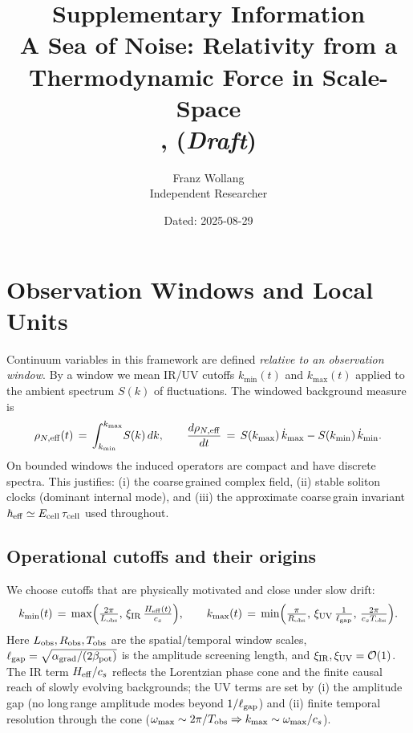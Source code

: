 \documentclass[11pt]{article}
\title{Supplementary Information\\A Sea of Noise: Relativity from a Thermodynamic Force in Scale-Space \\, (\textit{Draft})}
\author{Franz Wollang\\ \small Independent Researcher}
\date{\small Dated: 2025-08-29}
\begin{document}
\maketitle

\begin{center}
\setlength{\fboxsep}{8pt}%
\end{center}
\vspace{1em}

\tableofcontents
\vspace{1em}

\section{Observation Windows and Local Units}\label{si:window}
Continuum variables in this framework are defined \emph{relative to an observation window}. By a window we mean IR/UV cutoffs $k_{\min}(t)$ and $k_{\max}(t)$ applied to the ambient spectrum $S(k)$ of fluctuations. The windowed background measure is
\begin{equation}
  \rho_{N,\rm eff}(t) \,=\, \int_{k_{\min}}^{k_{\max}} \! S(k)\,dk,\qquad \frac{d\rho_{N,\rm eff}}{dt} \,=\, S(k_{\max})\,\dot k_{\max} - S(k_{\min})\,\dot k_{\min}.
\end{equation}
On bounded windows the induced operators are compact and have discrete spectra. This justifies: (i) the coarse\,grained complex field, (ii) stable soliton clocks (dominant internal mode), and (iii) the approximate coarse\,grain invariant $\hbar_{\rm eff}\simeq E_{\rm cell}\,\tau_{\rm cell}$ used throughout.

\subsection*{Operational cutoffs and their origins}
We choose cutoffs that are physically motivated and close under slow drift:
\begin{equation}
  k_{\min}(t) \,=\, \max\!\Big(\tfrac{2\pi}{L_{\rm obs}},\, \xi_{\rm IR}\,\tfrac{H_{\rm eff}(t)}{c_s}\Big),\qquad
  k_{\max}(t) \,=\, \min\!\Big(\tfrac{\pi}{R_{\rm obs}},\, \xi_{\rm UV}\,\tfrac{1}{\ell_{\rm gap}},\, \tfrac{2\pi}{c_s T_{\rm obs}}\Big).
\end{equation}
Here $L_{\rm obs},R_{\rm obs},T_{\rm obs}$ are the spatial/temporal window scales, $\ell_{\rm gap}=\sqrt{\alpha_{\rm grad}/(2\beta_{\rm pot})}$ is the amplitude screening length, and $\xi_{\rm IR},\xi_{\rm UV}=\mathcal O(1)$. The IR term $H_{\rm eff}/c_s$ reflects the Lorentzian phase cone and the finite causal reach of slowly evolving backgrounds; the UV terms are set by (i) the amplitude gap (no long\,range amplitude modes beyond $1/\ell_{\rm gap}$) and (ii) finite temporal resolution through the cone ($\omega_{\max}\sim 2\pi/T_{\rm obs}\Rightarrow k_{\max}\sim \omega_{\max}/c_s$).
\end{document}
